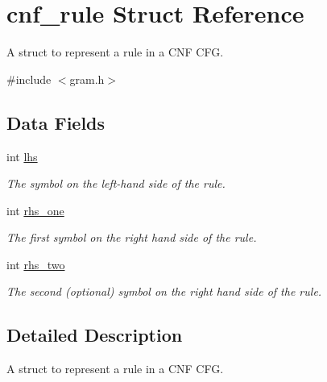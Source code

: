 \hypertarget{structcnf__rule}{\section{cnf\-\_\-rule \-Struct \-Reference}
\label{structcnf__rule}
}


\-A struct to represent a rule in a \-C\-N\-F \-C\-F\-G.  




{\ttfamily \#include $<$gram.\-h$>$}

\subsection*{\-Data \-Fields}
\begin{DoxyCompactItemize}
\item 
\hypertarget{structcnf__rule_ad79dfb552ae253049535ec9313589411}{int \hyperlink{structcnf__rule_ad79dfb552ae253049535ec9313589411}{lhs}}\label{structcnf__rule_ad79dfb552ae253049535ec9313589411}

\begin{DoxyCompactList}\small\item\em \-The symbol on the left-\/hand side of the rule. \end{DoxyCompactList}\item 
\hypertarget{structcnf__rule_ab118ace8dd815d94943b47babf4eb145}{int \hyperlink{structcnf__rule_ab118ace8dd815d94943b47babf4eb145}{rhs\-\_\-one}}\label{structcnf__rule_ab118ace8dd815d94943b47babf4eb145}

\begin{DoxyCompactList}\small\item\em \-The first symbol on the right hand side of the rule. \end{DoxyCompactList}\item 
\hypertarget{structcnf__rule_ac5c0566f94de7cc364b2a1bd7120eb66}{int \hyperlink{structcnf__rule_ac5c0566f94de7cc364b2a1bd7120eb66}{rhs\-\_\-two}}\label{structcnf__rule_ac5c0566f94de7cc364b2a1bd7120eb66}

\begin{DoxyCompactList}\small\item\em \-The second (optional) symbol on the right hand side of the rule. \end{DoxyCompactList}\end{DoxyCompactItemize}


\subsection{\-Detailed \-Description}
\-A struct to represent a rule in a \-C\-N\-F \-C\-F\-G. 

